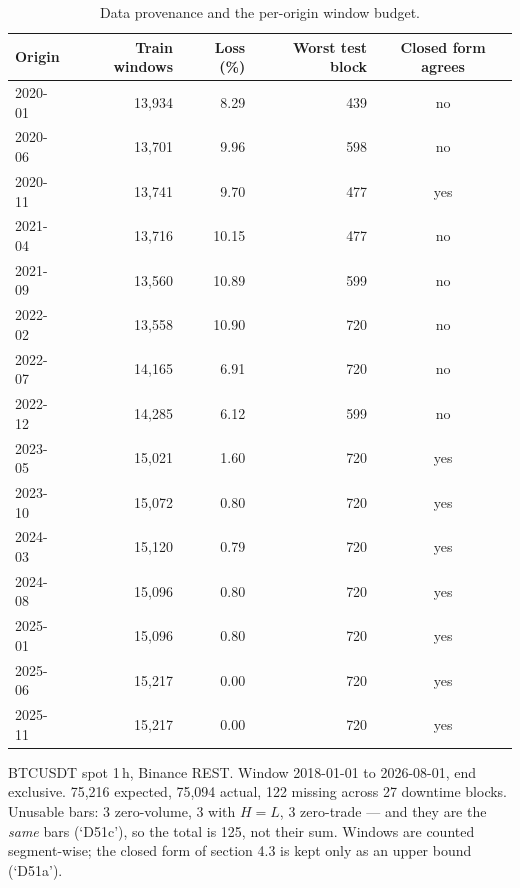 \begin{table}[!t]
\centering
\caption{Data provenance and the per-origin window budget.}
\label{tab:dataset}
\begin{tabular}{lrrrc}
\toprule
Origin & Train windows & Loss (\%) & Worst test block & Closed form agrees \\
\midrule
2020-01 & 13,934 & 8.29 & 439 & no \\
2020-06 & 13,701 & 9.96 & 598 & no \\
2020-11 & 13,741 & 9.70 & 477 & yes \\
2021-04 & 13,716 & 10.15 & 477 & no \\
2021-09 & 13,560 & 10.89 & 599 & no \\
2022-02 & 13,558 & 10.90 & 720 & no \\
2022-07 & 14,165 & 6.91 & 720 & no \\
2022-12 & 14,285 & 6.12 & 599 & no \\
2023-05 & 15,021 & 1.60 & 720 & yes \\
2023-10 & 15,072 & 0.80 & 720 & yes \\
2024-03 & 15,120 & 0.79 & 720 & yes \\
2024-08 & 15,096 & 0.80 & 720 & yes \\
2025-01 & 15,096 & 0.80 & 720 & yes \\
2025-06 & 15,217 & 0.00 & 720 & yes \\
2025-11 & 15,217 & 0.00 & 720 & yes \\
\bottomrule
\end{tabular}
\vspace{2pt}\par\footnotesize BTCUSDT spot 1\,h, Binance REST. Window 2018-01-01 to 2026-08-01, end exclusive. 75,216 expected, 75,094 actual, 122 missing across 27 downtime blocks. Unusable bars: 3 zero-volume, 3 with $H=L$, 3 zero-trade --- and they are the \emph{same} bars (`D51c'), so the total is 125, not their sum. Windows are counted segment-wise; the closed form of section 4.3 is kept only as an upper bound (`D51a').
\end{table}
